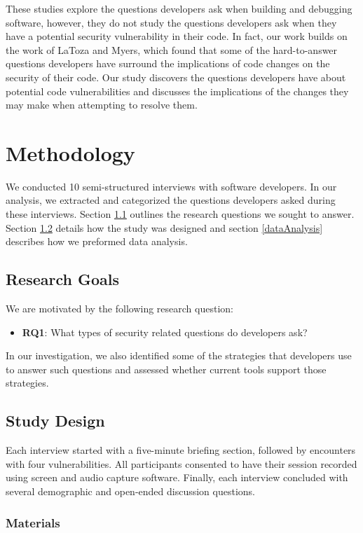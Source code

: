 \documentclass[conference]{IEEEtran}
\begin{document}
These studies explore the questions developers ask when building and debugging software, however, they do not study the questions developers ask when they have a potential security vulnerability in their code. 
In fact, our work builds on the work of LaToza and Myers, which found that some of the hard-to-answer questions developers have surround the implications of code changes on the security of their code. 
Our study discovers the questions developers have about potential code vulnerabilities and discusses the implications of the changes they may make when attempting to resolve them. 

\section{Methodology}
\label{sec:meth}
We conducted 10 semi-structured interviews with software developers. In our analysis, we extracted and categorized the questions developers asked during these interviews. 
Section \ref{rqs} outlines the research questions we sought to answer. 
Section \ref{studyDesign} details how the study was designed and section \ref{dataAnalysis} describes how we preformed data analysis.


\subsection{Research Goals}
\label{rqs}
We are motivated by the following research question:
\begin{itemize}
\item \textbf{RQ1}: What types of security related questions do developers ask?
\end{itemize}

In our investigation, we also identified some of the strategies that developers use to answer such questions and assessed whether current tools support those strategies.


\subsection{Study Design}
\label{studyDesign}
Each interview started with a five-minute briefing section, followed by encounters with four vulnerabilities.
All participants consented to have their session recorded using screen and audio capture software.
Finally, each interview concluded with several demographic and open-ended discussion questions.


\subsubsection{Materials}
\end{document}
